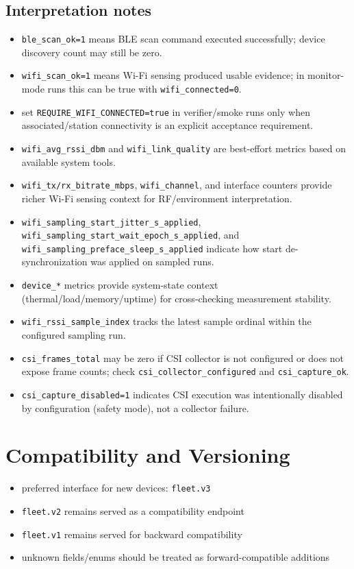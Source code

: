 \documentclass[11pt,a4paper]{article}
\begin{document}
\subsection{Interpretation notes}
\begin{itemize}
  \item \texttt{ble\_scan\_ok=1} means BLE scan command executed successfully; device discovery count may still be zero.
  \item \texttt{wifi\_scan\_ok=1} means Wi-Fi sensing produced usable evidence; in monitor-mode runs this can be true with \texttt{wifi\_connected=0}.
  \item set \texttt{REQUIRE\_WIFI\_CONNECTED=true} in verifier/smoke runs only when associated/station connectivity is an explicit acceptance requirement.
  \item \texttt{wifi\_avg\_rssi\_dbm} and \texttt{wifi\_link\_quality} are best-effort metrics based on available system tools.
  \item \texttt{wifi\_tx/rx\_bitrate\_mbps}, \texttt{wifi\_channel}, and interface counters provide richer Wi-Fi sensing context for RF/environment interpretation.
  \item \texttt{wifi\_sampling\_start\_jitter\_s\_applied}, \texttt{wifi\_sampling\_start\_wait\_epoch\_s\_applied}, and \texttt{wifi\_sampling\_preface\_sleep\_s\_applied} indicate how start de-synchronization was applied on sampled runs.
  \item \texttt{device\_*} metrics provide system-state context (thermal/load/memory/uptime) for cross-checking measurement stability.
  \item \texttt{wifi\_rssi\_sample\_index} tracks the latest sample ordinal within the configured sampling run.
  \item \texttt{csi\_frames\_total} may be zero if CSI collector is not configured or does not expose frame counts; check \texttt{csi\_collector\_configured} and \texttt{csi\_capture\_ok}.
  \item \texttt{csi\_capture\_disabled=1} indicates CSI execution was intentionally disabled by configuration (safety mode), not a collector failure.
\end{itemize}

\section{Compatibility and Versioning}
\begin{itemize}
  \item preferred interface for new devices: \texttt{fleet.v3}
  \item \texttt{fleet.v2} remains served as a compatibility endpoint
  \item \texttt{fleet.v1} remains served for backward compatibility
  \item unknown fields/enums should be treated as forward-compatible additions
\end{itemize}
\end{document}
